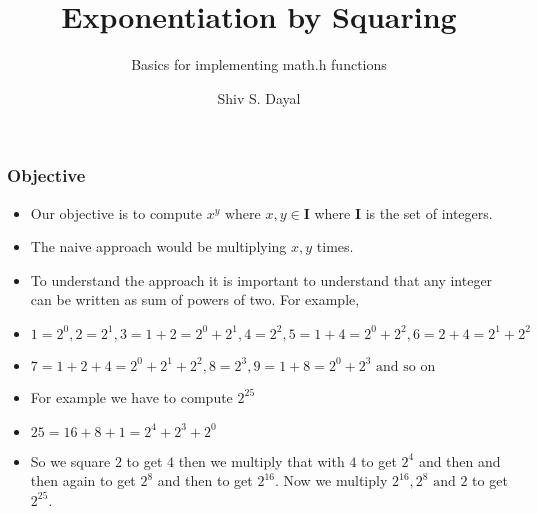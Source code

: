 \documentclass[aspectratio=1610]{beamer}
\begin{document}
\begin{frame}
\title{Exponentiation by Squaring}
\subtitle{Basics for implementing math.h functions}
\author{Shiv S. Dayal}
\titlepage
\end{frame}

\begin{frame}
\frametitle{Objective}
\begin{itemize}
\item Our objective is to compute $x^y \text{ where } x, y \in \mathbf{I}$
where $\mathbf{I}$ is the set of integers.
\item The naive approach would be multiplying $x, y$ times.
\item To understand the approach it is important to understand that any integer
can be written as sum of powers of two. For example,
\item $1=2^0, 2=2^1, 3=1+2=2^0+2^1, 4=2^2, 5=1+4=2^0+2^2, 6=2+4=2^1+2^2$
\item $7=1+2+4=2^0+2^1+2^2, 8=2^3, 9=1+8=2^0+2^3 \text{ and so on}$
\item For example we have to compute $2^{25}$
\item $25=16+8+1=2^4+2^3+2^0$
\item So we square $2$ to get $4$ then we multiply that with $4$ to get $2^4$
and then and then again to get $2^8$ and then to get $2^{16}$. Now we multiply
$2^{16}, 2^8 \text { and } 2 $ to get $2^{25}$.
\end{itemize}
\end{frame}
\end{document}
